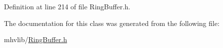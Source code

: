 Definition at line 214 of file Ring\-Buffer.\-h.



The documentation for this class was generated from the following file\-:\begin{DoxyCompactItemize}
\item 
mhvlib/\hyperlink{_ring_buffer_8h}{Ring\-Buffer.\-h}\end{DoxyCompactItemize}
